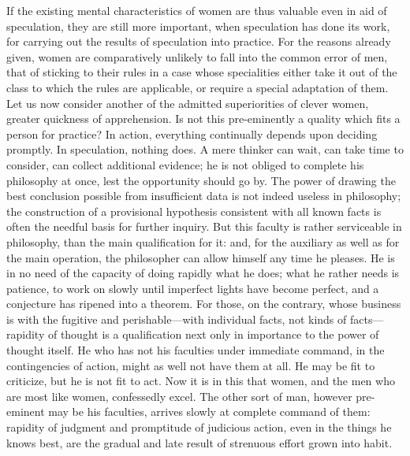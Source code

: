 \documentclass[12pt]{report}
\begin{document}
If the existing mental characteristics of women are thus valuable even in aid of speculation, they are still more important, when speculation has done its work, for carrying out the results of speculation into practice. For the reasons already given, women are comparatively unlikely to fall into the common error of men, that of sticking to their rules in a case whose specialities either take it out of the class to which the rules are applicable, or require a special adaptation of them. Let us now consider another of the admitted superiorities of clever women, greater quickness of apprehension. Is not this pre-eminently a quality which fits a person for practice? In action, everything continually depends upon deciding promptly. In speculation, nothing does. A mere thinker can wait, can take time to consider, can collect additional evidence; he is not obliged to complete his philosophy at once, lest the opportunity should go by. The power of drawing the best conclusion possible from insufficient data is not indeed useless in philosophy; the construction of a provisional hypothesis consistent with all known facts is often the needful basis for further inquiry. But this faculty is rather serviceable in philosophy, than the main qualification for it: and, for the auxiliary as well as for the main operation, the philosopher can allow himself any time he pleases. He is in no need of the capacity of doing rapidly what he does; what he rather needs is patience, to work on slowly until imperfect lights have become perfect, and a conjecture has ripened into a theorem. For those, on the contrary, whose business is with the fugitive and perishable—with individual facts, not kinds of facts—rapidity of thought is a qualification next only in importance to the power of thought itself. He who has not his faculties under immediate command, in the contingencies of action, might as well not have them at all. He may be fit to criticize, but he is not fit to act. Now it is in this that women, and the men who are most like women, confessedly excel. The other sort of man, however pre-eminent may be his faculties, arrives slowly at complete command of them: rapidity of judgment and promptitude of judicious action, even in the things he knows best, are the gradual and late result of strenuous effort grown into habit.
\end{document}

